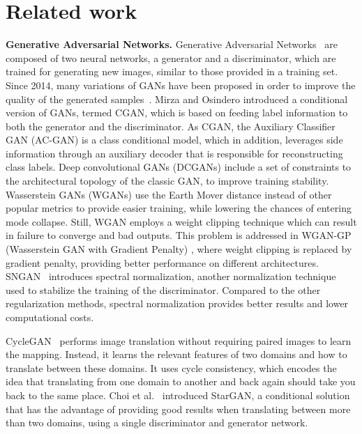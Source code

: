 \documentclass[10pt,twocolumn,letterpaper]{article}
\begin{document}
\vspace{-0.2cm}
\section{Related work}
\label{sec_Related_Work}


\noindent
{\bf Generative Adversarial Networks.}
Generative Adversarial Networks~\cite{Goodfellow-NIPS-2014} are composed of two neural networks, a generator and a discriminator, which are trained for generating new images, similar to those provided in a training set. Since 2014, many variations of GANs have been proposed in order to improve the quality of the generated samples~\cite{Arjovsky-arXiv-2017,Choi-CVPR-2018,Gulrajani-NIPS-2017,Isola-CVPR-2017,Lin-NIPS-2018,Mao-ICCV-2017,Mirza-arXiv-2014,Odena-ICML-2017,Radford-ICLR-2016,Reed-ICML-2016,Tolstikhin-NIPS-2017,Wang-ECCV-2016}. Mirza and Osindero \cite{Mirza-arXiv-2014} introduced a conditional version of GANs, termed CGAN, which is based on feeding label information to both the generator and the discriminator. As CGAN, the Auxiliary Classifier GAN (AC-GAN) \cite{Odena-ICML-2017} is a class conditional model, which in addition, leverages side information through an auxiliary decoder that is responsible for reconstructing class labels. Deep convolutional GANs (DCGANs) \cite{Radford-ICLR-2016} include a set of constraints to the architectural topology of the classic GAN, to improve training stability. Wasserstein GANs (WGANs) \cite{Arjovsky-arXiv-2017} use the Earth Mover distance instead of other popular metrics to provide easier training, while lowering the chances of entering mode collapse. Still, WGAN employs a weight clipping technique which can result in failure to converge and bad outputs. This problem is addressed in WGAN-GP (Wasserstein GAN with Gradient Penalty) \cite{Gulrajani-NIPS-2017}, where weight clipping is replaced by gradient penalty, providing better performance on different architectures. SNGAN~\cite{Miyato-ICLR-2018} introduces spectral normalization, another normalization technique used to stabilize the training of the discriminator. Compared to the other regularization methods, spectral normalization provides better results and lower computational costs. 



CycleGAN~\cite{Zhu-ICCV-2017} performs image translation without requiring paired images to learn the mapping. Instead, it learns the relevant features of two domains and how to translate between these domains. It uses cycle consistency, which encodes the idea that translating from one domain to another and back again should take you back to the same place. Choi et al.~\cite{Choi-CVPR-2018} introduced StarGAN, a conditional solution that has the advantage of providing good results when translating between more than two domains, using a single discriminator and generator network. 
\end{document}
